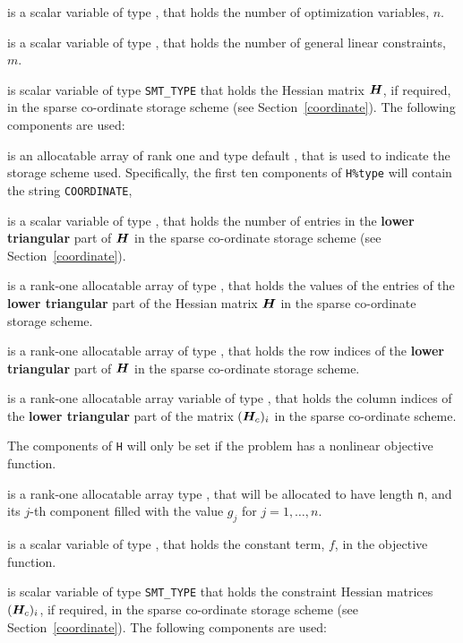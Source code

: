 \documentclass{galahad}
\begin{document}
\begin{description}

 is a scalar variable of type \integer,
 that holds the number of optimization variables, $n$.

 is a scalar variable of type \integer,
 that holds the number of general linear constraints, $m$.

 is scalar variable of type {\tt SMT\_TYPE}
that holds the Hessian matrix ${\bm{H}}$, if required,
in the sparse co-ordinate storage scheme (see Section~\ref{coordinate}).
The following components are used:

\begin{description}

 is an allocatable array of rank one and type default \character,
that is used to indicate the storage scheme used. Specifically,
the first ten components of {\tt H\%type} will contain the
string {\tt COORDINATE},

 is a scalar variable of type \integer, that
holds the number of entries in the {\bf lower triangular} part of ${\bm{H}}$
in the sparse co-ordinate storage scheme (see Section~\ref{coordinate}).

 is a rank-one allocatable array of type \realdp, that
holds the values of the entries of the {\bf lower triangular} part
of the Hessian matrix ${\bm{H}}$ in the sparse co-ordinate storage scheme.

 is a rank-one allocatable array of type \integer,
that holds the row indices of the {\bf lower triangular} part of ${\bm{H}}$
in the sparse co-ordinate storage scheme.

 is a rank-one allocatable array variable of type \integer,
that holds the column indices of the {\bf lower triangular} part of the
matrix $({\bm{H}}_c)_i$ in the sparse co-ordinate scheme.

\end{description}

The components of {\tt H} will only be set if the problem has a
nonlinear objective function.

 is a rank-one allocatable array type \realdp, that
will be allocated to have length {\tt n}, and its $j$-th component
filled with the value $g_{j}$ for $j = 1, \ldots , n$.

 is a scalar variable of type \realdp, that holds the
constant term, $f$, in the objective function.

 is scalar variable of type {\tt SMT\_TYPE}
that holds the constraint Hessian matrices $({\bm{H}}_c)_i$, if required,
in the sparse co-ordinate storage scheme (see Section~\ref{coordinate}).
The following components are used:


\end{description}
\end{document}
